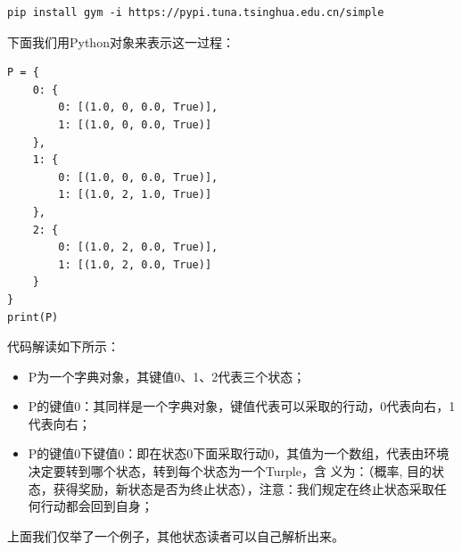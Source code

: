 \begin{lstlisting}
pip install gym -i https://pypi.tuna.tsinghua.edu.cn/simple 
\end{lstlisting}
下面我们用Python对象来表示这一过程：
\begin{lstlisting}
P = {
    0: {
        0: [(1.0, 0, 0.0, True)],
        1: [(1.0, 0, 0.0, True)]
    },
    1: {
        0: [(1.0, 0, 0.0, True)],
        1: [(1.0, 2, 1.0, True)]
    },
    2: {
        0: [(1.0, 2, 0.0, True)],
        1: [(1.0, 2, 0.0, True)]
    }
}
print(P)
\end{lstlisting}
代码解读如下所示：
\begin{itemize}
    \item P为一个字典对象，其键值0、1、2代表三个状态；
    \item P的键值0：其同样是一个字典对象，键值代表可以采取的行动，0代表向右，1代表向右；
    \item P的键值0下键值0：即在状态0下面采取行动0，其值为一个数组，代表由环境决定要转到哪个状态，转到每个状态为一个Turple，含
义为：（概率, 目的状态，获得奖励，新状态是否为终止状态），注意：我们规定在终止状态采取任何行动都会回到自身；
\end{itemize}
上面我们仅举了一个例子，其他状态读者可以自己解析出来。
